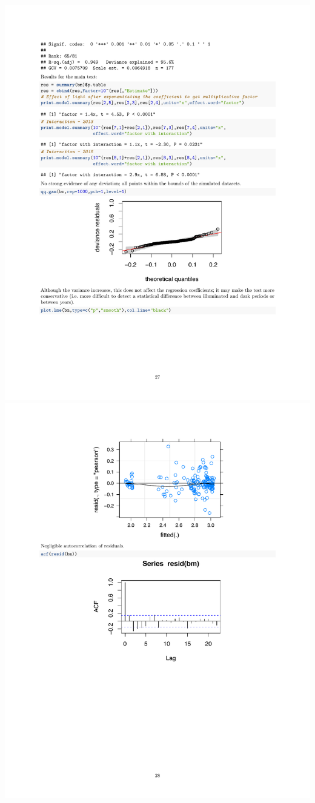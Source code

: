 \documentclass[a4paper, twoside]{templates/ociamthesis}
\begin{document}
\includegraphics[width=1\linewidth]{pdf_chapters/lights/lights_supp_crop_Part61}
\includegraphics[width=1\linewidth]{pdf_chapters/lights/lights_supp_crop_Part62}
\end{document}
